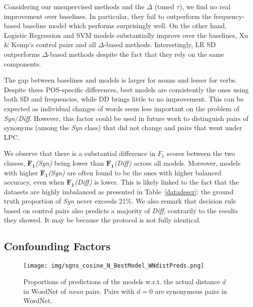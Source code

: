 \documentclass[11pt]{article}
\begin{document}
Considering our unsupervised methods and the $\Delta$ (tuned $\tau$), we find no real improvement over baselines. In particular, they fail to outperform the frequency-based baseline model which performs surprisingly well. On the other hand, Logistic Regression and SVM models substantially improve over the baselines, Xu \& Kemp's control pairs and all $\Delta$-based methods. Interestingly, LR SD outperforms $\Delta$-based methods despite the fact that they rely on the same components.

The gap between baselines and models is larger for nouns and lesser for verbs. Despite these POS-specific differences, best models are consistently the ones using both SD and frequencies, while DD brings little to no improvement. This can be expected as individual changes of words seem less important on the problem of \textit{Syn}/\textit{Diff}. However, this factor could be used in future work to distinguish pairs of synonyms (among the \textit{Syn} class) that did not change and pairs that went under LPC.

We observe that there is a substantial difference in $F_1$ scores between the two classes, $\mathbf{F_1}$\textit{(Syn)} being lower than $\mathbf{F_1}$\textit{(Diff)} across all models. Moreover, models with higher $\mathbf{F_1}$\textit{(Syn)} are often found to be the ones with higher balanced accuracy, even when $\mathbf{F_1}$\textit{(Diff)} is lower. This is likely linked to the fact that the datasets are highly imbalanced as presented in Table~\ref{datadescr}: the ground truth proportion of \textit{Syn} never exceeds 21\%. We also remark that \citet{xu-kemp-2015-evaluation} decision rule based on control pairs also predicts a majority of \textit{Diff}, contrarily to the results they showed. It may be because the protocol is not fully identical. 




\subsection{Confounding Factors}
\label{sec:analysisExt}


\begin{figure}
    \centering
    \texttt{[image: img/sgns\_cosine\_N\_BestModel\_WNdistPreds.png]}
    \caption{Proportions of predictions of the models w.r.t. the actual distance $d$ in WordNet of \textit{noun} pairs. Pairs with $d=0$ are synonymous pairs in WordNet.}
    \label{fig:WNdist_vs_preds}
\end{figure}
\end{document}
